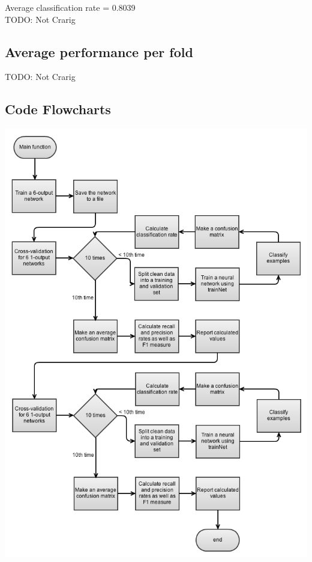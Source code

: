 \documentclass[12pt]{article}
\begin{document}
Average classification rate = 0.8039 \\ 

TODO: Not Crarig


\subsection*{Average performance per fold}

TODO: Not Crarig

\newpage
\subsection*{Code Flowcharts}

\begin{center}
  \includegraphics[scale=0.7]{report-images/main.png}
\end{center}

\end{document}
